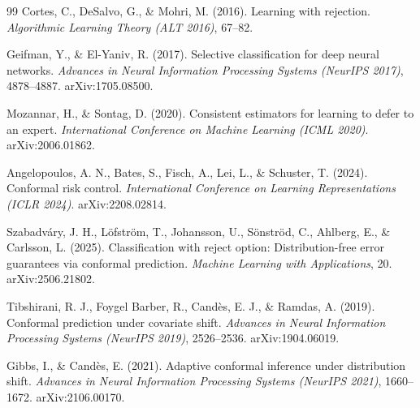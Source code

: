 \documentclass[11pt]{article}
\begin{document}
\begin{thebibliography}{99}
Cortes, C., DeSalvo, G., \& Mohri, M. (2016). Learning with rejection. \textit{Algorithmic Learning Theory (ALT 2016)}, 67--82.

Geifman, Y., \& El-Yaniv, R. (2017). Selective classification for deep neural networks. \textit{Advances in Neural Information Processing Systems (NeurIPS 2017)}, 4878--4887. arXiv:1705.08500.

Mozannar, H., \& Sontag, D. (2020). Consistent estimators for learning to defer to an expert. \textit{International Conference on Machine Learning (ICML 2020)}. arXiv:2006.01862.

Angelopoulos, A. N., Bates, S., Fisch, A., Lei, L., \& Schuster, T. (2024). Conformal risk control. \textit{International Conference on Learning Representations (ICLR 2024)}. arXiv:2208.02814.

Szabadv\'ary, J. H., L\"ofstr\"om, T., Johansson, U., S\"onstr\"od, C., Ahlberg, E., \& Carlsson, L. (2025). Classification with reject option: Distribution-free error guarantees via conformal prediction. \textit{Machine Learning with Applications}, 20. arXiv:2506.21802.

Tibshirani, R. J., Foygel Barber, R., Cand\`es, E. J., \& Ramdas, A. (2019). Conformal prediction under covariate shift. \textit{Advances in Neural Information Processing Systems (NeurIPS 2019)}, 2526--2536. arXiv:1904.06019.

Gibbs, I., \& Cand\`es, E. (2021). Adaptive conformal inference under distribution shift. \textit{Advances in Neural Information Processing Systems (NeurIPS 2021)}, 1660--1672. arXiv:2106.00170.

\end{thebibliography}
\end{document}
